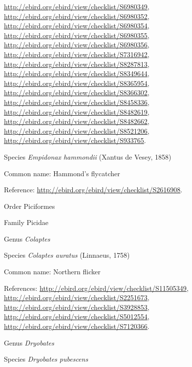 \documentclass[9pt, article]{memoir}
\begin{document}
\begin{multicols}{2}
\url{http://ebird.org/ebird/view/checklist/S6980349}, 
\url{http://ebird.org/ebird/view/checklist/S6980352}, 
\url{http://ebird.org/ebird/view/checklist/S6980354}, 
\url{http://ebird.org/ebird/view/checklist/S6980355}, 
\url{http://ebird.org/ebird/view/checklist/S6980356}, 
\url{http://ebird.org/ebird/view/checklist/S7316942}, 
\url{http://ebird.org/ebird/view/checklist/S8287813}, 
\url{http://ebird.org/ebird/view/checklist/S8349644}, 
\url{http://ebird.org/ebird/view/checklist/S8365954}, 
\url{http://ebird.org/ebird/view/checklist/S8366302}, 
\url{http://ebird.org/ebird/view/checklist/S8458336}, 
\url{http://ebird.org/ebird/view/checklist/S8482619}, 
\url{http://ebird.org/ebird/view/checklist/S8482662}, 
\url{http://ebird.org/ebird/view/checklist/S8521206}, 
\url{http://ebird.org/ebird/view/checklist/S933765}.

\vspace{6pt}\noindent\hspace{36pt}Species \textit{Empidonax hammondii} (Xantus de Vesey, 1858)


Common name: Hammond's flycatcher

Reference: 
\url{http://ebird.org/ebird/view/checklist/S2616908}.

\vspace{6pt}\noindent\hspace{18pt}Order Piciformes


\vspace{6pt}\noindent\hspace{24pt}Family Picidae


\vspace{6pt}\noindent\hspace{30pt}Genus \textit{Colaptes}


\vspace{6pt}\noindent\hspace{36pt}Species \textit{Colaptes auratus} (Linnaeus, 1758)


Common name: Northern flicker

References: 
\url{http://ebird.org/ebird/view/checklist/S11505349}, 
\url{http://ebird.org/ebird/view/checklist/S2251673}, 
\url{http://ebird.org/ebird/view/checklist/S3928853}, 
\url{http://ebird.org/ebird/view/checklist/S5012554}, 
\url{http://ebird.org/ebird/view/checklist/S7120366}.

\vspace{6pt}\noindent\hspace{30pt}Genus \textit{Dryobates}


\vspace{6pt}\noindent\hspace{36pt}Species \textit{Dryobates pubescens}



\end{multicols}
\end{document}
